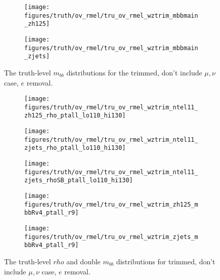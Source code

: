 \begin{figure}[!htbp]\captionsetup{justification=centering}
\begin{center}
\begin{subfigure}[t]{18pc}\centering\texttt{[image: figures/truth/ov\_rmel/tru\_ov\_rmel\_wztrim\_mbbmain\_zh125]}\caption{}\end{subfigure}
\begin{subfigure}[t]{18pc}\centering\texttt{[image: figures/truth/ov\_rmel/tru\_ov\_rmel\_wztrim\_mbbmain\_zjets]}\caption{}\end{subfigure}
\caption{\label{fig:mbbwztrim}The truth-level $m_{bb}$ distributions for the trimmed, don't include $\mu,\nu$ case, $e$ removal.}
\end{center}
\end{figure}
\begin{figure}[!htbp]\captionsetup{justification=centering}
\begin{center}
\begin{subfigure}[t]{18pc}\centering\texttt{[image: figures/truth/ov\_rmel/tru\_ov\_rmel\_wztrim\_ntel11\_zh125\_rho\_ptall\_lo110\_hi130]}\caption{}\end{subfigure}
\begin{subfigure}[t]{18pc}\centering\texttt{[image: figures/truth/ov\_rmel/tru\_ov\_rmel\_wztrim\_ntel11\_zjets\_rho\_ptall\_lo110\_hi130]}\caption{}\end{subfigure}
\begin{subfigure}[t]{18pc}\centering\texttt{[image: figures/truth/ov\_rmel/tru\_ov\_rmel\_wztrim\_ntel11\_zjets\_rhoSB\_ptall\_lo110\_hi130]}\caption{}\end{subfigure}
\begin{subfigure}[t]{18pc}\centering\texttt{[image: figures/truth/ov\_rmel/tru\_ov\_rmel\_wztrim\_zh125\_mbbRv4\_ptall\_r9]}\caption{}\end{subfigure}
\begin{subfigure}[t]{18pc}\centering\texttt{[image: figures/truth/ov\_rmel/tru\_ov\_rmel\_wztrim\_zjets\_mbbRv4\_ptall\_r9]}\caption{}\end{subfigure}
\caption{\label{fig:mbbwztrim}The truth-level $rho$ and double $m_{bb}$ distributions for trimmed, don't include $\mu,\nu$ case, $e$ removal.}
\end{center}
\end{figure}
